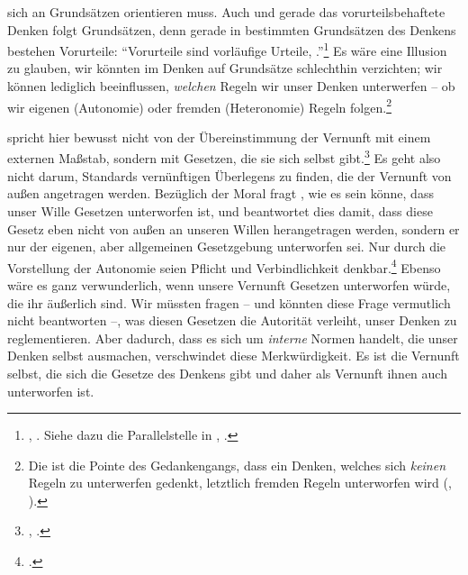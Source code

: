 sich an Grundsätzen orientieren muss. Auch und gerade das vorurteilsbehaftete
Denken folgt Grundsätzen, denn gerade in bestimmten Grundsätzen des Denkens
bestehen Vorurteile: \enquote{Vorurteile sind vorläufige Urteile, .}\footnote{\cite[][A
116]{Kant:ImmanuelKantsLogik1977}, \cite[][IX:
75.24--25]{Kant:GesammelteWerke1900ff.}. Siehe dazu die Parallelstelle in
\cite[][]{Kant:Reflexionen1900ff.},
\cite[][XVI: 409.5]{Kant:GesammelteWerke1900ff.}.} Es wäre eine Illusion zu
glauben, wir könnten im Denken auf Grundsätze schlechthin verzichten; wir können
lediglich beeinflussen, \emph{welchen} Regeln wir unser Denken unterwerfen -- ob
wir eigenen (Autonomie) oder fremden (Heteronomie) Regeln folgen.\footnote{Die
ist die Pointe des Gedankengangs, dass ein Denken, welches sich \emph{keinen} Regeln zu
unterwerfen gedenkt, letztlich fremden Regeln unterworfen wird
\mkbibparens{\cite[vgl.][A
326\,f.,]{Kant:Washeisst:SichimDenkenorientieren?1977}, \cite[][VIII:
145.6--35]{Kant:GesammelteWerke1900ff.}}.}

 spricht hier bewusst nicht von der Übereinstimmung der
Vernunft mit einem externen Maßstab, sondern mit Gesetzen, die sie sich selbst
gibt.\footnote{\cite[Vgl.][A 326]{Kant:Washeisst:SichimDenkenorientieren?1977},
\cite[][VIII: 145.6--7]{Kant:GesammelteWerke1900ff.}.}
Es geht also nicht darum, Standards vernünftigen Überlegens zu finden, die der Vernunft
von außen angetragen werden. Bezüglich der Moral fragt ,
wie es sein könne, dass unser Wille Gesetzen unterworfen ist, und beantwortet
dies damit, dass diese Gesetz eben nicht von außen an unseren Willen
herangetragen werden, sondern er nur der eigenen, aber allgemeinen Gesetzgebung
unterworfen sei. Nur durch die Vorstellung der Autonomie seien Pflicht und
Verbindlichkeit denkbar.\footnote{\cite[Vgl.][BA
73\,f.,]{Kant:GrundlegungzurMetaphysikderSitten1965} \cite[][IV:
432.25--433.11]{Kant:GesammelteWerke1900ff.}.} Ebenso wäre es ganz
verwunderlich, wenn unsere Vernunft Gesetzen unterworfen würde, die ihr
äußerlich sind. Wir müssten fragen -- und könnten diese Frage vermutlich nicht
beantworten --, was diesen Gesetzen die Autorität verleiht, unser Denken zu
reglementieren. Aber dadurch, dass es sich um \emph{interne} Normen handelt, die
unser Denken selbst ausmachen, verschwindet diese Merkwürdigkeit. Es ist die
Vernunft selbst, die sich die Gesetze des Denkens gibt und daher als Vernunft
ihnen auch unterworfen ist.


